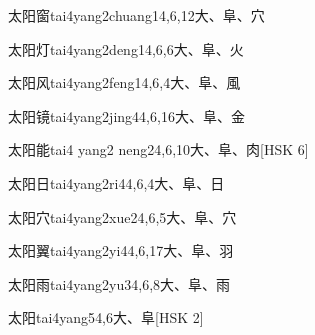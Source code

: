 \begin{EntryWithPhonetic}{太阳窗}{tai4yang2chuang1}{4,6,12}{⼤、⾩、⽳}
\end{EntryWithPhonetic}

\begin{EntryWithPhonetic}{太阳灯}{tai4yang2deng1}{4,6,6}{⼤、⾩、⽕}
\end{EntryWithPhonetic}

\begin{EntryWithPhonetic}{太阳风}{tai4yang2feng1}{4,6,4}{⼤、⾩、⾵}
\end{EntryWithPhonetic}

\begin{EntryWithPhonetic}{太阳镜}{tai4yang2jing4}{4,6,16}{⼤、⾩、⾦}
\end{EntryWithPhonetic}

\begin{EntryWithPhonetic}{太阳能}{tai4 yang2 neng2}{4,6,10}{⼤、⾩、⾁}[HSK 6]
\end{EntryWithPhonetic}

\begin{EntryWithPhonetic}{太阳日}{tai4yang2ri4}{4,6,4}{⼤、⾩、⽇}
\end{EntryWithPhonetic}

\begin{EntryWithPhonetic}{太阳穴}{tai4yang2xue2}{4,6,5}{⼤、⾩、⽳}
\end{EntryWithPhonetic}

\begin{EntryWithPhonetic}{太阳翼}{tai4yang2yi4}{4,6,17}{⼤、⾩、⽻}
\end{EntryWithPhonetic}

\begin{EntryWithPhonetic}{太阳雨}{tai4yang2yu3}{4,6,8}{⼤、⾩、⾬}
\end{EntryWithPhonetic}

\begin{EntryWithPhonetic}{太阳}{tai4yang5}{4,6}{⼤、⾩}[HSK 2]
\end{EntryWithPhonetic}

